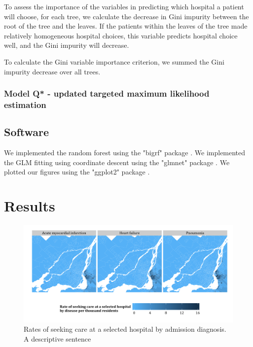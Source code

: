 \documentclass[]{article}
\begin{document}
To assess the importance of the variables in predicting which hospital a patient will choose, for each tree, we calculate the decrease in Gini impurity between the root of the tree and the leaves. If the patients within the leaves of the tree made relatively homogeneous hospital choices, this variable predicts hospital choice well, and the Gini impurity will decrease.
 
To calculate the Gini variable importance criterion, we summed the Gini impurity decrease over all trees.


\subsubsection{Model Q* - updated targeted maximum likelihood estimation}




\subsection{Software}
We implemented the random forest using the "bigrf" \cite{lim_bigrf:_2014} package . We implemented the GLM fitting using coordinate descent using the "glmnet" package \cite{friedman_regularization_2010}. We plotted our figures using the "ggplot2" package \cite{wickham_ggplot2:_2009}.


\section{Results}
\begin{figure}[H]
    \includegraphics{../figures/hosp_choro.png}
    \caption[Rates of seeking care at a selected hospital by admission diagnosis.]
      {Rates of seeking care at a selected hospital by admission diagnosis. A descriptive sentence}
    \label{fig:hosp_choro}
\end{figure}
\end{document}
